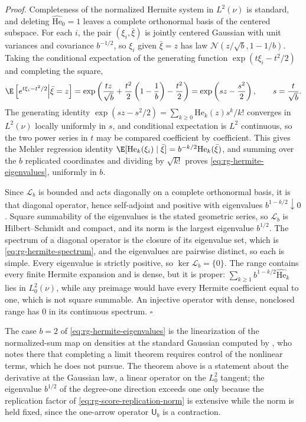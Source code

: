 \noindent\emph{Proof.}
Completeness of the normalized Hermite system in \(L^2(\nu)\) is standard, and deleting
\(\widehat{\mathrm{He}}_0=1\) leaves a complete orthonormal basis of the centered subspace. For each
\(i\), the pair \((\xi_i,\bar\xi)\) is jointly centered Gaussian with unit variances and
covariance \(b^{-1/2}\), so \(\xi_i\) given \(\bar\xi=z\) has law
\(\mathcal N(z/\sqrt b,1-1/b)\). Taking the conditional expectation of the generating
function \(\exp(t\xi_i-t^2/2)\) and completing the square,
\begin{equation}
\E\left[e^{t\xi_i-t^2/2}\middle|\bar\xi=z\right]
=\exp\left(\frac{tz}{\sqrt b}+\frac{t^2}2\left(1-\frac1b\right)-\frac{t^2}2\right)
=\exp\left(sz-\frac{s^2}2\right),
\qquad s=\frac t{\sqrt b}.
\label{eq:rg-mehler-generating}
\end{equation}
The generating identity \(\exp(sz-s^2/2)=\sum_{k\geq0}\mathrm{He}_k(z)s^k/k!\) converges in
\(L^2(\nu)\) locally uniformly in \(s\), and conditional expectation is \(L^2\)
continuous, so the two power series in \(t\) may be compared coefficient by
coefficient. This gives the Mehler regression identity
\(\E[\mathrm{He}_k(\xi_i)\mid\bar\xi]=b^{-k/2}\mathrm{He}_k(\bar\xi)\), and summing over the
\(b\) replicated coordinates and dividing by \(\sqrt{k!}\) proves
\eqref{eq:rg-hermite-eigenvalues}, uniformly in \(b\).

Since \(\mathscr L_b\) is bounded and acts diagonally on a complete orthonormal basis, it
is that diagonal operator, hence self-adjoint and positive with eigenvalues
\(b^{1-k/2}\downarrow0\). Square summability of the eigenvalues is the stated geometric
series, so \(\mathscr L_b\) is Hilbert--Schmidt and compact, and its norm is the largest
eigenvalue \(b^{1/2}\). The spectrum of a diagonal operator is the closure of its
eigenvalue set, which is \eqref{eq:rg-hermite-spectrum}, and the eigenvalues are pairwise
distinct, so each is simple. Every eigenvalue is strictly positive, so
\(\ker\mathscr L_b=\{0\}\). The range contains every finite Hermite expansion and is
dense, but it is proper: \(\sum_{k\geq1}b^{1-k/2}\widehat{\mathrm{He}}_k\) lies in \(L^2_0(\nu)\), while any
preimage would have every Hermite coefficient equal to one, which is not square
summable. An injective operator with dense, nonclosed range has \(0\) in its continuous
spectrum. \hfill$\square$

\medskip
The case \(b=2\) of \eqref{eq:rg-hermite-eigenvalues} is the linearization of the
normalized-sum map on densities at the standard Gaussian computed by
\citet[Sec.~2, Eq.~(2.14)]{JonaLasinio2001}, who notes there that completing a limit
theorem requires control of the nonlinear terms, which he does not pursue. The
theorem above is a statement about the derivative at the Gaussian law, a linear
operator on the \(L^2_0\) tangent; the eigenvalue \(b^{1/2}\) of the degree-one direction
exceeds one only because the replication factor of
\eqref{eq:rg-score-replication-norm} is extensive while the norm is held fixed, since
the one-arrow operator \(\mathsf U_b\) is a contraction.

